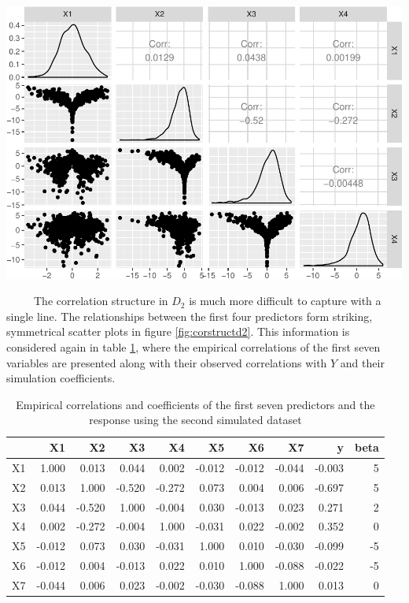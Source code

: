 \documentclass[12pt,twoside]{reedthesis}
\let\origfigure\figure
\let\endorigfigure\endfigure
\renewenvironment{figure}[1][2] {
    \expandafter\origfigure\expandafter[H]
} {
    \endorigfigure
}
\begin{document}
  \begin{figure}[htbp]
  \centering
  \includegraphics{Thesis_files/figure-latex/unnamed-chunk-15-1.pdf}
  \caption{\label{fig:unnamed-chunk-15}\label{fig:corstructd2}Correlation
  structure of the first four variables in D2}
  \end{figure}
  
  ~~~~~The correlation structure in \(D_2\) is much more difficult to
  capture with a single line. The relationships between the first four
  predictors form striking, symmetrical scatter plots in figure
  \ref{fig:corstructd2}. This information is considered again in table
  \ref{tab:tabcorSim2}, where the empirical correlations of the first
  seven variables are presented along with their observed correlations
  with \(Y\) and their simulation coefficients.
  
  \begin{table}
  
  \caption{\label{tab:unnamed-chunk-17}\label{tab:tabcorSim2}Empirical correlations and coefficients of the first seven predictors and the response using the second simulated dataset}
  \centering
  \begin{tabular}[t]{l|r|r|r|r|r|r|r|r|r}
  \hline
    & X1 & X2 & X3 & X4 & X5 & X6 & X7 & y & beta\\
  \hline
  X1 & 1.000 & 0.013 & 0.044 & 0.002 & -0.012 & -0.012 & -0.044 & -0.003 & 5\\
  \hline
  X2 & 0.013 & 1.000 & -0.520 & -0.272 & 0.073 & 0.004 & 0.006 & -0.697 & 5\\
  \hline
  X3 & 0.044 & -0.520 & 1.000 & -0.004 & 0.030 & -0.013 & 0.023 & 0.271 & 2\\
  \hline
  X4 & 0.002 & -0.272 & -0.004 & 1.000 & -0.031 & 0.022 & -0.002 & 0.352 & 0\\
  \hline
  X5 & -0.012 & 0.073 & 0.030 & -0.031 & 1.000 & 0.010 & -0.030 & -0.099 & -5\\
  \hline
  X6 & -0.012 & 0.004 & -0.013 & 0.022 & 0.010 & 1.000 & -0.088 & -0.022 & -5\\
  \hline
  X7 & -0.044 & 0.006 & 0.023 & -0.002 & -0.030 & -0.088 & 1.000 & 0.013 & 0\\
  \hline
  \end{tabular}
  \end{table}
  
\end{document}
